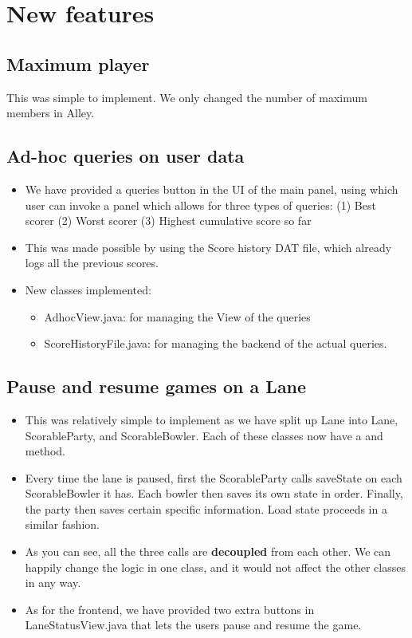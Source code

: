 \section{New features}

\subsection{Maximum player}

This was simple to implement. We only changed the number of maximum members in Alley.

\subsection{Ad-hoc queries on user data}

\begin{itemize}
\item We have provided a queries button in the UI of the main panel, using which user can invoke a panel which allows for three types of queries: (1) Best scorer (2) Worst scorer (3) Highest cumulative score so far
\item This was made possible by using the Score history DAT file, which already logs all the previous scores.
\item New classes implemented:
    \begin{itemize}
        \item AdhocView.java: for managing the View of the queries
        \item ScoreHistoryFile.java: for managing the backend of the actual queries.
    \end{itemize}
\end{itemize}

\subsection{Pause and resume games on a Lane}

\begin{itemize}
\item This was relatively simple to implement as we have split up Lane into Lane, ScorableParty, and ScorableBowler. Each of these classes now have a  and  method.
\item Every time the lane is paused, first the ScorableParty calls saveState on each ScorableBowler it has. Each bowler then saves its own state in order. Finally, the party then saves certain specific information. Load state proceeds in a similar fashion.
\item As you can see, all the three  calls are \textbf{decoupled} from each other. We can happily change the logic in one class, and it would not affect the other classes in any way.
\item As for the frontend, we have provided two extra buttons in LaneStatusView.java that lets the users pause and resume the game.
\end{itemize}

